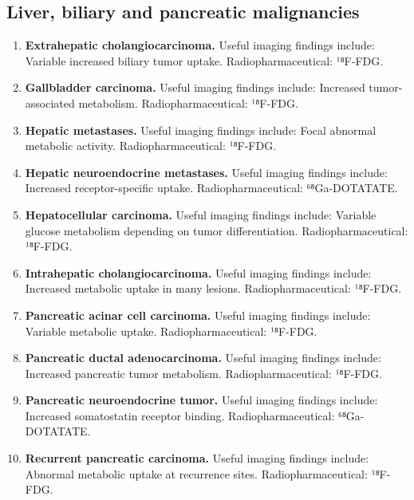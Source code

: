 \subsection{Liver, biliary and pancreatic malignancies}
\begin{enumerate}[leftmargin=*,itemsep=0.45em,topsep=0.4em]
\item \textbf{Extrahepatic cholangiocarcinoma.} Useful imaging findings include: Variable increased biliary tumor uptake. Radiopharmaceutical: ¹⁸F-FDG.
\item \textbf{Gallbladder carcinoma.} Useful imaging findings include: Increased tumor-associated metabolism. Radiopharmaceutical: ¹⁸F-FDG.
\item \textbf{Hepatic metastases.} Useful imaging findings include: Focal abnormal metabolic activity. Radiopharmaceutical: ¹⁸F-FDG.
\item \textbf{Hepatic neuroendocrine metastases.} Useful imaging findings include: Increased receptor-specific uptake. Radiopharmaceutical: ⁶⁸Ga-DOTATATE.
\item \textbf{Hepatocellular carcinoma.} Useful imaging findings include: Variable glucose metabolism depending on tumor differentiation. Radiopharmaceutical: ¹⁸F-FDG.
\item \textbf{Intrahepatic cholangiocarcinoma.} Useful imaging findings include: Increased metabolic uptake in many lesions. Radiopharmaceutical: ¹⁸F-FDG.
\item \textbf{Pancreatic acinar cell carcinoma.} Useful imaging findings include: Variable metabolic uptake. Radiopharmaceutical: ¹⁸F-FDG.
\item \textbf{Pancreatic ductal adenocarcinoma.} Useful imaging findings include: Increased pancreatic tumor metabolism. Radiopharmaceutical: ¹⁸F-FDG.
\item \textbf{Pancreatic neuroendocrine tumor.} Useful imaging findings include: Increased somatostatin receptor binding. Radiopharmaceutical: ⁶⁸Ga-DOTATATE.
\item \textbf{Recurrent pancreatic carcinoma.} Useful imaging findings include: Abnormal metabolic uptake at recurrence sites. Radiopharmaceutical: ¹⁸F-FDG.
\end{enumerate}

